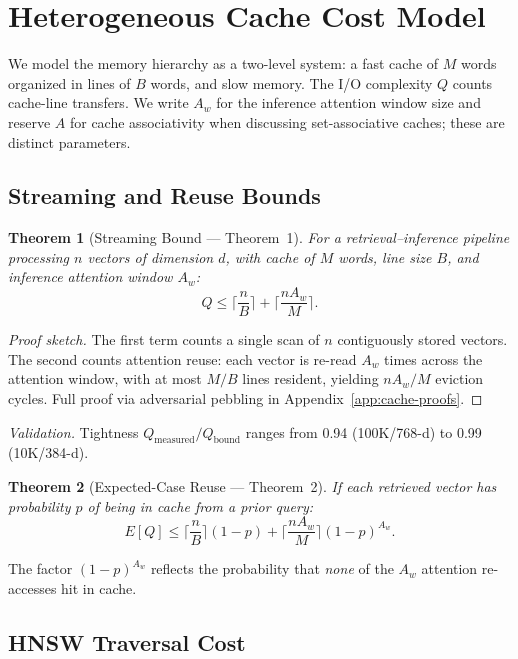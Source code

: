 \documentclass{article}
\newtheorem{theorem}{Theorem}
\theoremstyle{definition}
\theoremstyle{remark}
\newcommand{\ceil}[1]{\lceil #1 \rceil}
\begin{document}
\section{Heterogeneous Cache Cost Model}\label{sec:cache}

We model the memory hierarchy as a two-level system: a fast cache of $M$ words organized in lines of $B$ words, and slow memory.
The I/O complexity $Q$ counts cache-line transfers.
We write $A_w$ for the inference attention window size and reserve $A$ for cache associativity when discussing set-associative caches; these are distinct parameters.

\subsection{Streaming and Reuse Bounds}

\begin{theorem}[Streaming Bound --- Theorem~1]\label{thm:streaming}
For a retrieval--inference pipeline processing $n$ vectors of dimension $d$, with cache of $M$ words, line size $B$, and inference attention window $A_w$:
\[
  Q \leq \ceil{\frac{n}{B}} + \ceil{\frac{nA_w}{M}}.
\]
\end{theorem}

\begin{proof}[Proof sketch]
The first term counts a single scan of $n$ contiguously stored vectors.
The second counts attention reuse: each vector is re-read $A_w$ times across the attention window, with at most $M/B$ lines resident, yielding $nA_w/M$ eviction cycles.
Full proof via adversarial pebbling in Appendix~\ref{app:cache-proofs}.
\end{proof}

\emph{Validation.}
Tightness $Q_{\mathrm{measured}} / Q_{\mathrm{bound}}$ ranges from 0.94 (100K/768-d) to 0.99 (10K/384-d).

\begin{theorem}[Expected-Case Reuse --- Theorem~2]\label{thm:reuse}
If each retrieved vector has probability $p$ of being in cache from a prior query:
\[
  E[Q] \leq \ceil{\frac{n}{B}}(1-p) + \ceil{\frac{nA_w}{M}}(1-p)^{A_w}.
\]
\end{theorem}

The factor $(1-p)^{A_w}$ reflects the probability that \emph{none} of the $A_w$ attention re-accesses hit in cache.

\subsection{HNSW Traversal Cost}
\end{document}
